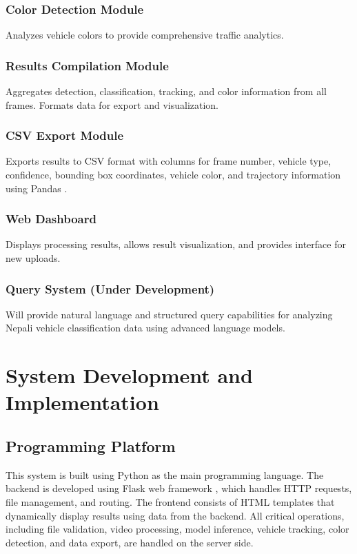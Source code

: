 \documentclass[12pt,a4paper]{report}
\begin{document}
\subsection{Color Detection Module}
Analyzes vehicle colors to provide comprehensive traffic analytics.

\subsection{Results Compilation Module}
Aggregates detection, classification, tracking, and color information from all frames. Formats data for export and visualization.

\subsection{CSV Export Module}
Exports results to CSV format with columns for frame number, vehicle type, confidence, bounding box coordinates, vehicle color, and trajectory information using Pandas \cite{mckinney2010data}.

\subsection{Web Dashboard}
Displays processing results, allows result visualization, and provides interface for new uploads.

\subsection{Query System (Under Development)}
Will provide natural language and structured query capabilities for analyzing Nepali vehicle classification data using advanced language models.



\chapter{System Development and Implementation}

\section{Programming Platform}
This system is built using Python as the main programming language. The backend is developed using Flask web framework \cite{flask2023}, which handles HTTP requests, file management, and routing. The frontend consists of HTML templates that dynamically display results using data from the backend. All critical operations, including file validation, video processing, model inference, vehicle tracking, color detection, and data export, are handled on the server side.
\end{document}
